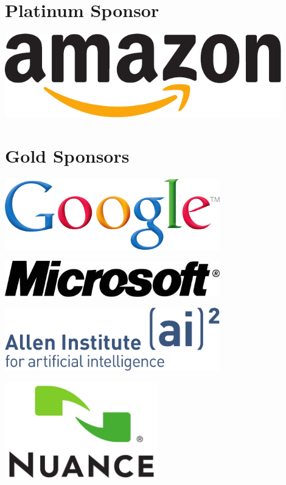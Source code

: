 \clearpage
\renewcommand{\leftheader}{Conference Sponsors}  
\renewcommand{\rightheader}{Conference Sponsors}  

\section*{Platinum Sponsor}
\begin{center}
\includegraphics[width=0.9\textwidth]{logos/amazon_logo_CMYK}
\end{center}
\vspace{0.5in}

\section*{Gold Sponsors}
\begin{center}
\includegraphics[width=0.7\textwidth]{logos/GoogleShadedLogo_Print-crop}
\end{center}
\begin{center}
\includegraphics[width=0.7\textwidth]{logos/mslogo-1_72dpi-Oct2013.jpg}
\end{center}
\begin{center}
\includegraphics[width=0.7\textwidth]{logos/A2_Logo-crop}
\end{center}
\begin{center}
\includegraphics[width=0.5\textwidth]{logos/Large_Nuance_Logo.pdf}
\end{center}

